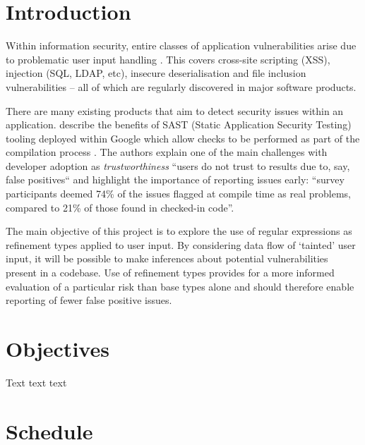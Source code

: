 \documentclass[a4paper]{article}
\title{}
\author{}
\begin{document}
    
    
    \section*{Introduction}
    
    Within information security, entire classes of application vulnerabilities arise due to problematic user input handling \citep{christey2007vulnerability}. This covers cross-site scripting (XSS), injection (SQL, LDAP, etc), insecure
    deserialisation and file inclusion vulnerabilities -- all of which are regularly discovered in major software products.
    
    There are many existing products that aim to detect security issues within an application. \citeauthor{Sadowski:2018:LBS:3200906.3188720} describe the benefits of SAST (Static Application Security Testing) tooling deployed within Google which allow checks to be performed as part of the compilation process \citeyearpar{Sadowski:2018:LBS:3200906.3188720}. The authors explain one of the main challenges with developer adoption as \emph{trustworthiness} ``users do not trust to results due to, say, false positives`` and highlight the importance of reporting issues early: ``survey participants deemed 74\% of the issues flagged at compile time as real problems, compared to 21\% of those found in checked-in code''. 
    
    The main objective of this project is to explore the use of regular expressions as refinement types applied to user input. By considering data flow of `tainted' user input, it will be possible to make inferences about potential vulnerabilities present in a codebase. Use of refinement types provides for a more informed evaluation of a particular risk than base types alone and should therefore enable reporting of fewer false positive issues.
    
    \section*{Objectives}
    
    Text text text
    
    \section*{Schedule}
    
\end{document}
